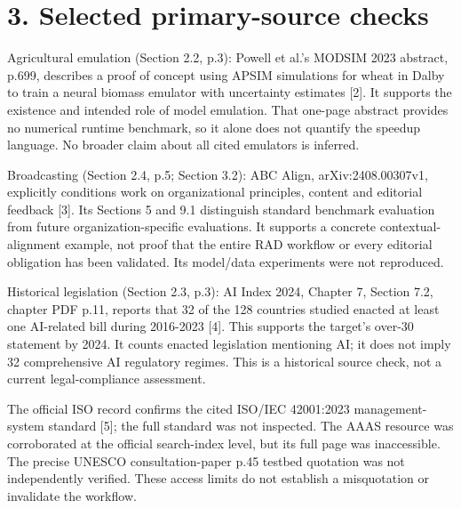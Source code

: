 \documentclass[10pt]{article}
\begin{document}
\section*{3. Selected primary-source checks}
Agricultural emulation (Section 2.2, p.3): Powell et al.’s MODSIM 2023 abstract, p.699, describes a proof of concept using APSIM simulations for wheat in Dalby to train a neural biomass emulator with uncertainty estimates [2]. It supports the existence and intended role of model emulation. That one-page abstract provides no numerical runtime benchmark, so it alone does not quantify the speedup language. No broader claim about all cited emulators is inferred.\par
Broadcasting (Section 2.4, p.5; Section 3.2): ABC Align, arXiv:2408.00307v1, explicitly conditions work on organizational principles, content and editorial feedback [3]. Its Sections 5 and 9.1 distinguish standard benchmark evaluation from future organization-specific evaluations. It supports a concrete contextual-alignment example, not proof that the entire RAD workflow or every editorial obligation has been validated. Its model/data experiments were not reproduced.\par
Historical legislation (Section 2.3, p.3): AI Index 2024, Chapter 7, Section 7.2, chapter PDF p.11, reports that 32 of the 128 countries studied enacted at least one AI-related bill during 2016-2023 [4]. This supports the target’s over-30 statement by 2024. It counts enacted legislation mentioning AI; it does not imply 32 comprehensive AI regulatory regimes. This is a historical source check, not a current legal-compliance assessment.\par
The official ISO record confirms the cited ISO/IEC 42001:2023 management-system standard [5]; the full standard was not inspected. The AAAS resource was corroborated at the official search-index level, but its full page was inaccessible. The precise UNESCO consultation-paper p.45 testbed quotation was not independently verified. These access limits do not establish a misquotation or invalidate the workflow.\par
\end{document}
